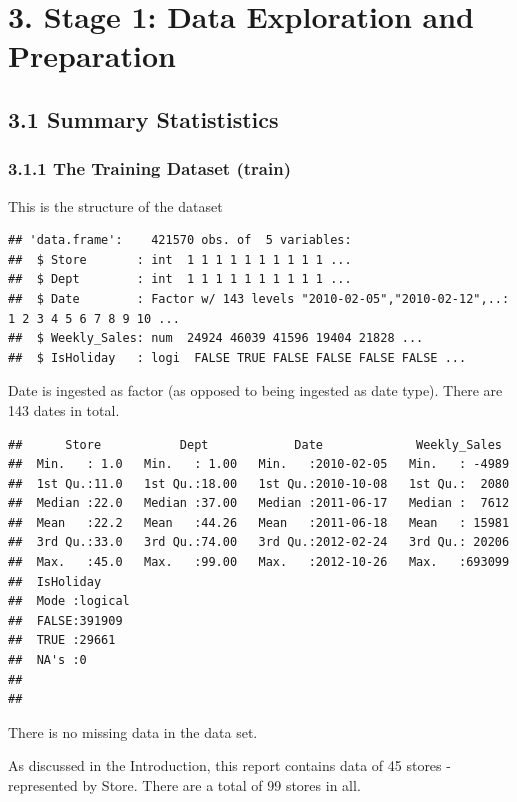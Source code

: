 \documentclass[]{article}
\begin{document}
\pagebreak

\section{3. Stage 1: Data Exploration and
Preparation}\label{stage-1-data-exploration-and-preparation}

\subsection{3.1 Summary Statististics}\label{summary-statististics}

\subsubsection{3.1.1 The Training Dataset
(train)}\label{the-training-dataset-train}

This is the structure of the dataset

\begin{verbatim}
## 'data.frame':    421570 obs. of  5 variables:
##  $ Store       : int  1 1 1 1 1 1 1 1 1 1 ...
##  $ Dept        : int  1 1 1 1 1 1 1 1 1 1 ...
##  $ Date        : Factor w/ 143 levels "2010-02-05","2010-02-12",..: 1 2 3 4 5 6 7 8 9 10 ...
##  $ Weekly_Sales: num  24924 46039 41596 19404 21828 ...
##  $ IsHoliday   : logi  FALSE TRUE FALSE FALSE FALSE FALSE ...
\end{verbatim}

Date is ingested as factor (as opposed to being ingested as date type).
There are 143 dates in total.

\begin{verbatim}
##      Store           Dept            Date             Weekly_Sales   
##  Min.   : 1.0   Min.   : 1.00   Min.   :2010-02-05   Min.   : -4989  
##  1st Qu.:11.0   1st Qu.:18.00   1st Qu.:2010-10-08   1st Qu.:  2080  
##  Median :22.0   Median :37.00   Median :2011-06-17   Median :  7612  
##  Mean   :22.2   Mean   :44.26   Mean   :2011-06-18   Mean   : 15981  
##  3rd Qu.:33.0   3rd Qu.:74.00   3rd Qu.:2012-02-24   3rd Qu.: 20206  
##  Max.   :45.0   Max.   :99.00   Max.   :2012-10-26   Max.   :693099  
##  IsHoliday      
##  Mode :logical  
##  FALSE:391909   
##  TRUE :29661    
##  NA's :0        
##                 
## 
\end{verbatim}

 There is no missing data in the data set.

As discussed in the Introduction, this report contains data of 45 stores
- represented by Store. There are a total of 99 stores in all.
\end{document}

